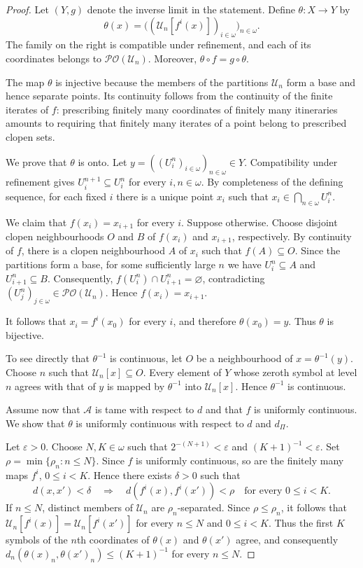 \documentclass[10pt,a4paper]{amsart}
\numberwithin{equation}{section}
\begin{document}
\begin{proof}
Let $(Y,g)$ denote the inverse limit in the statement. Define
$\theta:X\to Y$ by
\[
\theta(x)
=
\bigl((\mathcal U_n[f^i(x)])_{i\in\omega}\bigr)_{n\in\omega}.
\]
The family on the right is compatible under refinement, and each of its
coordinates belongs to $\mathcal{PO}(\mathcal U_n)$. Moreover,
$\theta\circ f=g\circ\theta$.

The map $\theta$ is injective because the members of the partitions
$\mathcal U_n$ form a base and hence separate points. Its continuity follows
from the continuity of the finite iterates of $f$: prescribing finitely many
coordinates of finitely many itineraries amounts to requiring that finitely
many iterates of a point belong to prescribed clopen sets.

We prove that $\theta$ is onto. Let
$y=((U_i^n)_{i\in\omega})_{n\in\omega}\in Y$. Compatibility under refinement
gives $U_i^{n+1}\subseteq U_i^n$ for every $i,n\in\omega$. By completeness
of the defining sequence, for each fixed $i$ there is a unique point $x_i$
such that
$x_i\in\bigcap_{n\in\omega}U_i^n$.

We claim that $f(x_i)=x_{i+1}$ for every $i$. Suppose otherwise. Choose
disjoint clopen neighbourhoods $O$ and $B$ of $f(x_i)$ and $x_{i+1}$,
respectively. By continuity of $f$, there is a clopen neighbourhood $A$ of
$x_i$ such that $f(A)\subseteq O$. Since the partitions form a base, for
some sufficiently large $n$ we have $U_i^n\subseteq A$ and
$U_{i+1}^n\subseteq B$. Consequently,
$f(U_i^n)\cap U_{i+1}^n=\varnothing$, contradicting
$(U_j^n)_{j\in\omega}\in\mathcal{PO}(\mathcal U_n)$. Hence
$f(x_i)=x_{i+1}$.

It follows that $x_i=f^i(x_0)$ for every $i$, and therefore
$\theta(x_0)=y$. Thus $\theta$ is bijective.

To see directly that $\theta^{-1}$ is continuous, let $O$ be a neighbourhood
of $x=\theta^{-1}(y)$. Choose $n$ such that
$\mathcal U_n[x]\subseteq O$. Every element of $Y$ whose zeroth symbol at
level $n$ agrees with that of $y$ is mapped by $\theta^{-1}$ into
$\mathcal U_n[x]$. Hence $\theta^{-1}$ is continuous.

Assume now that $\mathcal A$ is tame with respect to $d$ and that $f$ is
uniformly continuous. We show that $\theta$ is uniformly continuous with
respect to $d$ and $d_{\Pi}$.

Let $\varepsilon>0$. Choose $N,K\in\omega$ such that
$2^{-(N+1)}<\varepsilon$ and $(K+1)^{-1}<\varepsilon$. Set
$\rho=\min\{\rho_n:n\leq N\}$. Since $f$ is uniformly continuous, so are
the finitely many maps $f^i$, $0\leq i<K$. Hence there exists $\delta>0$
such that
\[
d(x,x')<\delta
\quad\Longrightarrow\quad
d(f^i(x),f^i(x'))<\rho
\quad\text{for every }0\leq i<K.
\]
If $n\leq N$, distinct members of $\mathcal U_n$ are
$\rho_n$-separated. Since $\rho\leq\rho_n$, it follows that
$\mathcal U_n[f^i(x)]=\mathcal U_n[f^i(x')]$ for every $n\leq N$ and
$0\leq i<K$. Thus the first $K$ symbols of the $n$th coordinates of
$\theta(x)$ and $\theta(x')$ agree, and consequently
$d_n(\theta(x)_n,\theta(x')_n)\leq(K+1)^{-1}$ for every $n\leq N$.


\end{proof}
\end{document}
